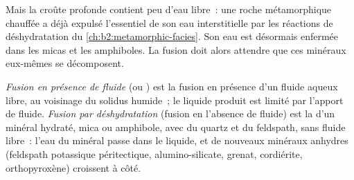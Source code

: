 \begin{omfigure}
\centering
{}
\par{}
\end{omfigure}

Mais la croûte profonde contient peu d'eau libre~: une roche métamorphique chauffée a
déjà expulsé l'essentiel de son eau interstitielle par les réactions de déshydratation du
\cref{ch:b2:metamorphic-facies}. Son eau est désormais enfermée dans les micas et les amphiboles. La
fusion doit alors attendre que ces minéraux eux-mêmes se décomposent.

\begin{definition}\label{def:b2:crustal-melting:reactions}
\emph{Fusion en présence de fluide} (ou ) est
la fusion en présence d'un fluide aqueux libre, au voisinage du solidus humide~; le liquide
produit est limité par l'apport de fluide. \emph{Fusion par déshydratation}
(fusion en l'absence de fluide) est la  d'un minéral hydraté, mica ou
amphibole, avec du quartz et du feldspath, sans fluide libre~: l'eau du minéral
passe dans le liquide, et de nouveaux minéraux anhydres (feldspath potassique péritectique, alumino-silicate,
grenat, cordiérite, orthopyroxène) croissent à côté.
\end{definition}

